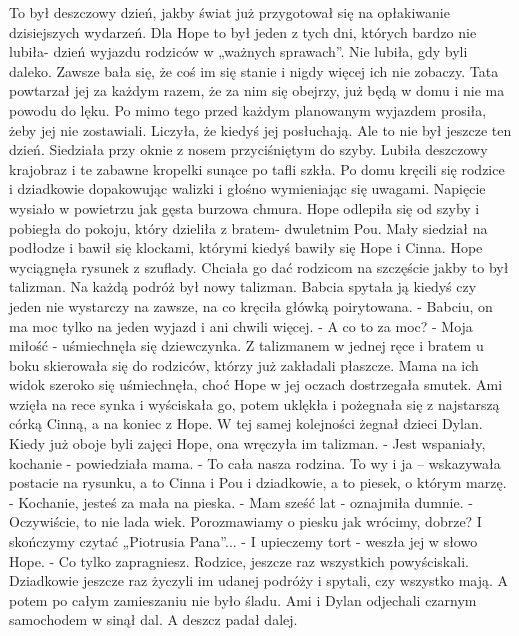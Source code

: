 \documentclass[12pt,a4paper]{book}
\begin{document}
To był deszczowy dzień, jakby świat już przygotował się na opłakiwanie dzisiejszych wydarzeń. 
Dla Hope to był jeden z tych dni, których bardzo nie lubiła- dzień wyjazdu rodziców w „ważnych sprawach”. Nie lubiła, gdy byli daleko. Zawsze bała się, że coś im się stanie i nigdy więcej ich nie zobaczy. Tata powtarzał jej za każdym razem, że za nim się obejrzy, już będą w domu i nie ma powodu do lęku. Po mimo tego przed każdym planowanym wyjazdem prosiła, żeby jej nie zostawiali. Liczyła, że kiedyś jej posłuchają. Ale to nie był jeszcze ten dzień. 
Siedziała przy oknie z nosem przyciśniętym do szyby. Lubiła deszczowy krajobraz i te zabawne kropelki sunące po tafli szkła. 
Po domu kręcili się rodzice i dziadkowie dopakowując walizki i głośno wymieniając się uwagami. Napięcie wysiało w powietrzu jak gęsta burzowa chmura. 
Hope odlepiła się od szyby i pobiegła do pokoju, który dzieliła z bratem- dwuletnim Pou. Mały siedział na podłodze i bawił się klockami, którymi kiedyś bawiły się Hope i Cinna. Hope wyciągnęła rysunek z szuflady. Chciała go dać rodzicom na szczęście jakby to był talizman. Na każdą podróż był nowy talizman. Babcia spytała ją kiedyś czy jeden nie wystarczy na zawsze, na co kręciła główką poirytowana. 
- Babciu, on ma moc tylko na jeden wyjazd i ani chwili więcej. 
- A co to za moc?
- Moja miłość - uśmiechnęła się dziewczynka. 
Z talizmanem w jednej ręce i bratem u boku skierowała się do rodziców, którzy już zakładali płaszcze. Mama na ich widok szeroko się uśmiechnęła, choć Hope w jej oczach dostrzegała smutek. Ami wzięła na rece synka i wyściskała go, potem uklękła i pożegnała się z najstarszą córką Cinną, a na koniec z Hope. W tej samej kolejności żegnał dzieci Dylan. Kiedy już oboje byli zajęci Hope, ona wręczyła im talizman. 
- Jest wspaniały, kochanie - powiedziała mama. 
- To cała nasza rodzina. To wy i ja – wskazywała postacie na rysunku, a to Cinna i Pou i dziadkowie, a to piesek, o którym marzę. 
- Kochanie, jesteś za mała na pieska. 
- Mam sześć lat - oznajmiła dumnie. 
- Oczywiście, to nie lada wiek. Porozmawiamy o piesku jak wrócimy, dobrze? I skończymy czytać „Piotrusia Pana”...
- I upieczemy tort - weszła jej w słowo Hope. 
- Co tylko zapragniesz. 
Rodzice, jeszcze raz wszystkich powyściskali. Dziadkowie jeszcze raz życzyli im udanej podróży i spytali, czy wszystko mają. A potem po całym zamieszaniu nie było śladu. Ami i Dylan odjechali czarnym samochodem w sinął dal. A deszcz padał dalej. 
                                              
\end{document}
